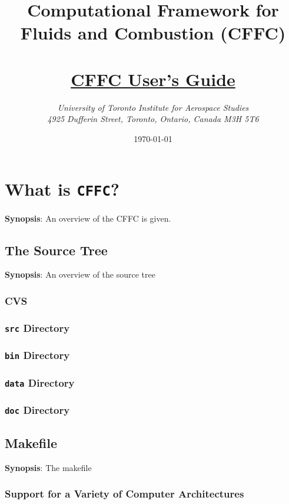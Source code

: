 \documentclass[11pt]{report}
\title{\Large \bf
       Computational Framework for Fluids and Combustion (CFFC)\\
       \ \\ \Huge
       \protect\underline{CFFC User's Guide}}
\author{\Large \em 
        University of Toronto Institute for Aerospace Studies\\
        \Large \em
        4925 Dufferin Street, Toronto, Ontario, Canada M3H 5T6}
\date{\today}
\begin{document}
\maketitle

\tableofcontents

\chapter{What is {\tt CFFC}?}

{\bf Synopsis}: An overview of the CFFC is given.

\section{The Source Tree}

{\bf Synopsis}: An overview of the source tree

\subsection{CVS}

\subsection{{\tt src} Directory}

\subsection{{\tt bin} Directory}

\subsection{{\tt data} Directory}

\subsection{{\tt doc} Directory}

\section{Makefile}

{\bf Synopsis}: The makefile

\subsection{Support for a Variety of Computer Architectures}
\end{document}

